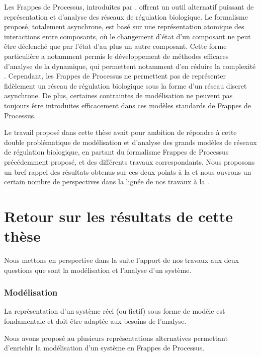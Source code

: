 Les Frappes de Processus, introduites par ,
offrent un outil alternatif puissant de représentation et d'analyse des
réseaux de régulation biologique.
Le formalisme proposé, totalement asynchrone, est basé sur une représentation
atomique des interactions entre composants,
où le changement d'état d'un composant ne peut être déclenché que par l'état d'au plus
un autre composant.
Cette forme particulière a notamment permis le développement de méthodes efficaces
d'analyse de la dynamique, qui permettent notamment d'en réduire la complexité \cite{PMR12-MSCS}.
Cependant, les Frappes de Processus ne permettent pas de représenter fidèlement
un réseau de régulation biologique sous la forme d'un réseau discret asynchrone.
De plus, certaines contraintes de modélisation ne peuvent pas toujours être introduites
efficacement dans ces modèles standards de Frappes de Processus.

Le travail proposé dans cette thèse avait pour ambition de répondre à cette double problématique
de modélisation et d'analyse des grands modèles de réseaux de régulation biologique,
en partant du formalisme Frappes de Processus précédemment proposé,
et des différents travaux correspondants.
Nous proposons un bref rappel des résultats obtenus sur ces deux points à la 
et nous ouvrons un certain nombre de perspectives dans la lignée de nos travaux
à la .



\section{Retour sur les résultats de cette thèse}

Nous mettons en perspective dans la suite l'apport de nos travaux aux deux questions
que sont la modélisation et l'analyse d'un système.

\subsubsection*{Modélisation}

La représentation d'un système réel (ou fictif) sous forme de modèle est fondamentale
et doit être adaptée aux besoins de l'analyse.

\myskip

Nous avons proposé au  plusieurs représentations alternatives
permettant d'enrichir la modélisation d'un système en Frappes de Processus.

